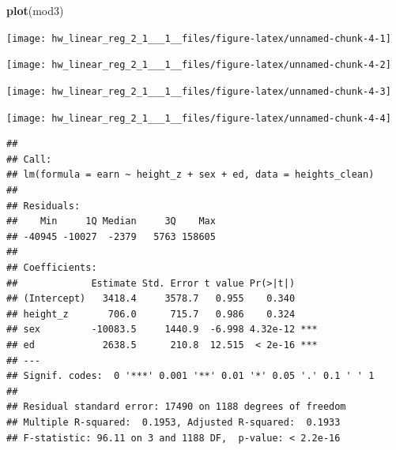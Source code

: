 \documentclass[]{article}
\newenvironment{Shaded}{\begin{snugshade}}{\end{snugshade}}
\newcommand{\KeywordTok}[1]{\textcolor[rgb]{0.13,0.29,0.53}{\textbf{#1}}}
\newcommand{\DataTypeTok}[1]{\textcolor[rgb]{0.13,0.29,0.53}{#1}}
\newcommand{\CommentTok}[1]{\textcolor[rgb]{0.56,0.35,0.01}{\textit{#1}}}
\newcommand{\OperatorTok}[1]{\textcolor[rgb]{0.81,0.36,0.00}{\textbf{#1}}}
\newcommand{\NormalTok}[1]{#1}
\begin{document}
\begin{Shaded}
\begin{Highlighting}[]
\KeywordTok{plot}\NormalTok{(mod3)}
\end{Highlighting}
\end{Shaded}

\begin{center}\texttt{[image: hw\_linear\_reg\_2\_1\_\_\_1\_\_files/figure-latex/unnamed-chunk-4-1]} \end{center}

\begin{center}\texttt{[image: hw\_linear\_reg\_2\_1\_\_\_1\_\_files/figure-latex/unnamed-chunk-4-2]} \end{center}

\begin{center}\texttt{[image: hw\_linear\_reg\_2\_1\_\_\_1\_\_files/figure-latex/unnamed-chunk-4-3]} \end{center}

\begin{center}\texttt{[image: hw\_linear\_reg\_2\_1\_\_\_1\_\_files/figure-latex/unnamed-chunk-4-4]} \end{center}

\begin{Shaded}
\end{Shaded}

\begin{verbatim}
## 
## Call:
## lm(formula = earn ~ height_z + sex + ed, data = heights_clean)
## 
## Residuals:
##    Min     1Q Median     3Q    Max 
## -40945 -10027  -2379   5763 158605 
## 
## Coefficients:
##             Estimate Std. Error t value Pr(>|t|)    
## (Intercept)   3418.4     3578.7   0.955    0.340    
## height_z       706.0      715.7   0.986    0.324    
## sex         -10083.5     1440.9  -6.998 4.32e-12 ***
## ed            2638.5      210.8  12.515  < 2e-16 ***
## ---
## Signif. codes:  0 '***' 0.001 '**' 0.01 '*' 0.05 '.' 0.1 ' ' 1
## 
## Residual standard error: 17490 on 1188 degrees of freedom
## Multiple R-squared:  0.1953, Adjusted R-squared:  0.1933 
## F-statistic: 96.11 on 3 and 1188 DF,  p-value: < 2.2e-16
\end{verbatim}
\end{document}
